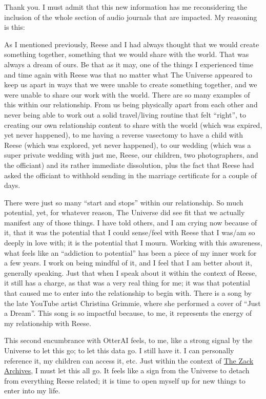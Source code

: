 \documentclass{article}
\begin{document}
Thank you. I must admit that this new information has me reconsidering the inclusion of the whole section of audio journals that are impacted. My reasoning is this:

As I mentioned previously, Reese and I had always thought that we would create something together, something that we would share with the world. That was always a dream of ours. Be that as it may, one of the things I experienced time and time again with Reese was that no matter what The Universe appeared to keep us apart in ways that we were unable to create something together, and we were unable to share our work with the world. There are so many examples of this within our relationship. From us being physically apart from each other and never being able to work out a solid travel/living routine that felt ``right'', to creating our own relationship content to share with the world (which was expired, yet never happened), to me having a reverse vasectomy to have a child with Reese (which was explored, yet never happened), to our wedding (which was a super private wedding with just me, Reese, our children, two photographers, and the officiant) and its rather immediate dissolution, plus the fact that Reese had asked the officiant to withhold sending in the marriage certificate for a couple of days.

There were just so many ``start and stops'' within our relationship. So much potential, yet, for whatever reason, The Universe did see fit that we actually manifest any of those things. I have told others, and I am crying now because of it, that it was the potential that I could sense/feel with Reese that I was/am so deeply in love with; it is the potential that I mourn. Working with this awareness, what feels like an ``addiction to potential'' has been a piece of my inner work for a few years. I work on being mindful of it, and I feel that I am better about it, generally speaking. Just that when I speak about it within the context of Reese, it still has a charge, as that was a very real thing for me; it was that potential that caused me to enter into the relationship to begin with. There is a song by the late YouTube artist Christina Grimmie, where she performed a cover of ``Just a Dream''. This song is so impactful because, to me, it represents the energy of my relationship with Reese.

This second encumbrance with OtterAI feels, to me, like a strong signal by the Universe to let this go; to let this data go. I still have it. I can personally reference it, my children can access it, etc. Just within the context of \hyperlink{gloss:the_zack_archives}{The Zack Archives}, I must let this all go. It feels like a sign from the Universe to detach from everything Reese related; it is time to open myself up for new things to enter into my life.
\end{document}
